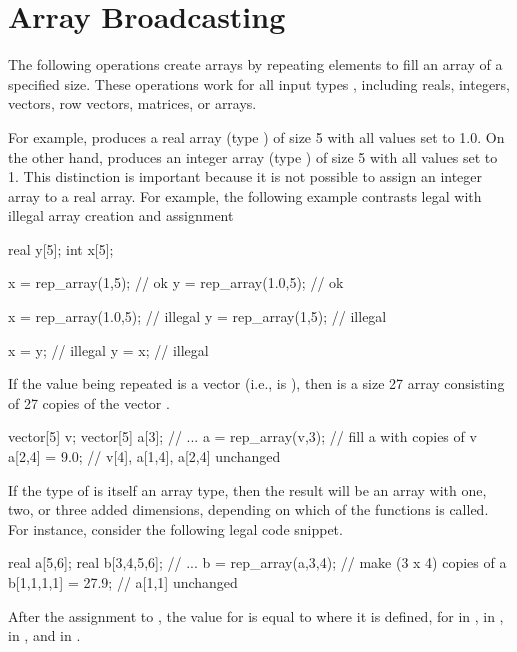 \section{Array Broadcasting}\label{array-broadcasting.section}

The following operations create arrays by repeating elements to fill
an array of a specified size.  These operations work for all input
types , including reals, integers, vectors, row vectors,
matrices, or arrays.
%
\begin{description}
%
%
\end{description}
%
For example,  produces a real array (type
) of size 5 with all values set to 1.0.  On the other
hand,  produces an integer array (type
) of size 5 with all values set to 1.  This distinction is
important because it is not possible to assign an integer array to a
real array.  For example, the following example contrasts legal with
illegal array creation and assignment
%
\begin{stancode}
real y[5];
int x[5];

x = rep_array(1,5);     // ok
y = rep_array(1.0,5);   // ok

x = rep_array(1.0,5);   // illegal 
y = rep_array(1,5);     // illegal

x = y;                  // illegal
y = x;                  // illegal
\end{stancode}

If the value being repeated  is a vector (i.e.,  is
), then  is a size 27 array
consisting of 27 copies of the vector .
%
\begin{stancode}
vector[5] v;
vector[5] a[3];
// ...
a = rep_array(v,3);  // fill a with copies of v
a[2,4] = 9.0;        // v[4], a[1,4], a[2,4] unchanged
\end{stancode}

If the type  of  is itself an array type, then the
result will be an array with one, two, or three added dimensions,
depending on which of the  functions is called.  For
instance, consider the following legal code snippet.
%
\begin{stancode}
real a[5,6];
real b[3,4,5,6];
// ...
b = rep_array(a,3,4); //  make (3 x 4) copies of a
b[1,1,1,1] = 27.9;    //  a[1,1] unchanged
\end{stancode}
%
After the assignment to , the value for  is
equal to  where it is defined, for  in ,
 in ,  in , and  in
.

